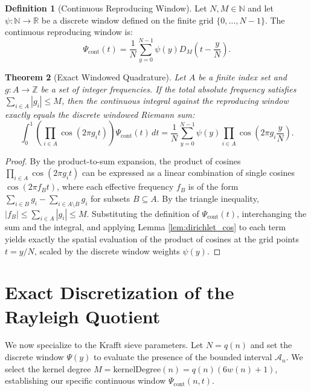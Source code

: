 \documentclass{aomart}
\newtheorem{theorem}{Theorem}[section]
\theoremstyle{definition}
\newtheorem{definition}[theorem]{Definition}
\newcommand{\mathcalA}{\mathcal{A}}
\newcommand{\mathbbR}{\mathbb{R}}
\newcommand{\mathbbN}{\mathbb{N}}
\newcommand{\mathbbZ}{\mathbb{Z}}
\begin{document}
\begin{definition}[Continuous Reproducing Window]
Let $N, M \in \mathbbN$ and let $\psi : \mathbbN \to \mathbbR$ be a discrete window defined on the
finite grid $\{0, \dots, N-1\}$. The continuous reproducing window is:
\[ \Psi_{\text{cont}}(t) = \frac{1}{N} \sum_{y=0}^{N-1} \psi(y) D_M\left(t - \frac{y}{N}\right). \]
\end{definition}

\begin{theorem}[Exact Windowed Quadrature] \label{thm:exact_quadrature}
Let $A$ be a finite index set and $g : A \to \mathbbZ$ be a set of integer frequencies. If the
total absolute frequency satisfies $\sum_{i \in A} |g_i| \le M$, then the continuous integral
against the reproducing window exactly equals the discrete windowed Riemann sum:
\[ \int_{0}^{1} \left( \prod_{i \in A} \cos(2\pi g_i t) \right) \Psi_{\text{cont}}(t) \, dt = \frac{1}{N} \sum_{y=0}^{N-1} \psi(y) \prod_{i \in A} \cos\left( 2\pi g_i \frac{y}{N} \right). \]
\end{theorem}
\begin{proof}
\begin{sloppypar}
By the product-to-sum expansion, the product of cosines $\prod_{i \in A} \cos(2\pi g_i t)$ can be
expressed as a linear combination of single cosines $\cos(2\pi f_B t)$, where each effective
frequency $f_B$ is of the form $\sum_{i \in B} g_i - \sum_{i \in A \setminus B} g_i$ for subsets
$B \subseteq A$. By the triangle inequality, $|f_B| \le \sum_{i \in A} |g_i| \le M$.
Substituting the definition of $\Psi_{\text{cont}}(t)$, interchanging the sum and the integral,
and applying Lemma \ref{lem:dirichlet_cos} to each term yields exactly the spatial evaluation of the
product of cosines at the grid points $t = y/N$, scaled by the discrete window weights $\psi(y)$.
\end{sloppypar}
\end{proof}

\section{Exact Discretization of the Rayleigh Quotient} \label{sec:discretization}

We now specialize to the Krafft sieve parameters. Let $N = q(n)$ and set the discrete window
$\Psi(y)$ to evaluate the presence of the bounded interval $\mathcalA_n$. We select the kernel
degree $M = \text{kernelDegree}(n) = q(n)(6w(n)+1)$, establishing our specific continuous window
$\Psi_{\text{cont}}(n, t)$.
\end{document}
